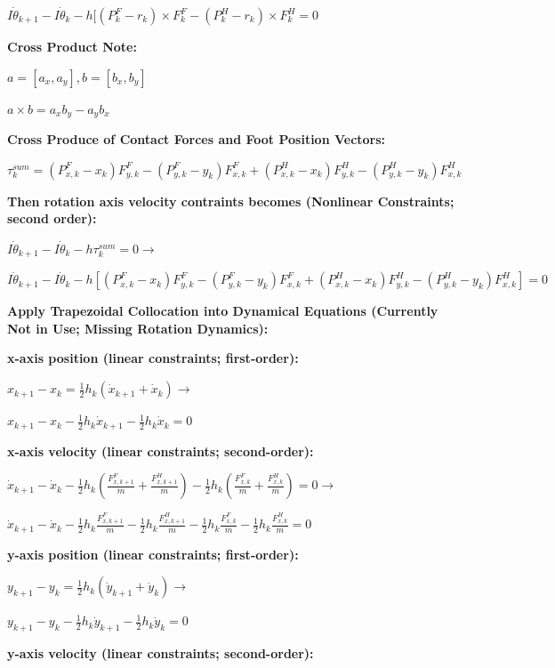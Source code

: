 \documentclass[a4paper,10pt]{article}
\begin{document}
$I\dot{\theta}_{k+1} - I\dot{\theta}_k - h[(P^F_k - r_k) \times F^F_k - (P^H_k - r_k) \times F^H_k = 0$

\textbf{Cross Product Note: }

$a = [a_x, a_y], b = [b_x, b_y]$

$a \times b = a_xb_y - a_yb_x$

\textbf{Cross Produce of Contact Forces and Foot Position Vectors:}

$\tau^{sum}_k = (P^F_{x,k} - x_k)F^F_{y,k} - (P^F_{y,k} - y_k)F^F_{x,k} + (P^H_{x,k} - x_k)F^H_{y,k} - (P^H_{y,k} - y_k)F^H_{x,k} $

\textbf{Then rotation axis velocity contraints becomes (Nonlinear Constraints; second order):}

$I\dot{\theta}_{k+1} - I\dot{\theta}_k - h\tau^{sum}_k = 0 \rightarrow$

$I\dot{\theta}_{k+1} - I\dot{\theta}_k - h[(P^F_{x,k} - x_k)F^F_{y,k} - (P^F_{y,k} - y_k)F^F_{x,k} + (P^H_{x,k} - x_k)F^H_{y,k} - (P^H_{y,k} - y_k)F^H_{x,k}] = 0$

\vspace{10mm}

\textbf{Apply Trapezoidal Collocation into Dynamical Equations (Currently Not in Use; Missing Rotation Dynamics):}

\textbf{x-axis position (linear constraints; first-order):} 

$x_{k+1}-x_k=\frac{1}{2}h_k(\dot{x}_{k+1}+\dot{x}_k) \rightarrow$

$x_{k+1}-x_k-\frac{1}{2}h_k\dot{x}_{k+1}-\frac{1}{2}h_k\dot{x}_k = 0$

\textbf{x-axis velocity (linear constraints; second-order): }

$\dot{x}_{k+1}-\dot{x}_k-\frac{1}{2}h_k(\frac{F^F_{x,k+1}}{m}+\frac{F^H_{x,k+1}}{m})-\frac{1}{2}h_k(\frac{F^F_{x,k}}{m}+\frac{F^H_{x,k}}{m}) = 0 \rightarrow$

$\dot{x}_{k+1}-\dot{x}_k-\frac{1}{2}h_k\frac{F^F_{x,k+1}}{m}-\frac{1}{2}h_k\frac{F^H_{x,k+1}}{m}-\frac{1}{2}h_k\frac{F^F_{x,k}}{m}-\frac{1}{2}h_k\frac{F^H_{x,k}}{m} = 0$

\textbf{y-axis position (linear constraints; first-order):} 

$y_{k+1}-y_k = \frac{1}{2}h_k(\dot{y}_{k+1}+\dot{y}_k) \rightarrow$

$y_{k+1}-y_k-\frac{1}{2}h_k\dot{y}_{k+1}-\frac{1}{2}h_k\dot{y}_k = 0$

\textbf{y-axis velocity (linear constraints; second-order):}
\end{document}
